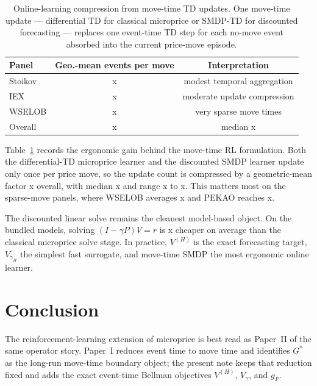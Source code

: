 \documentclass[11pt,twoside]{article}
\theoremstyle{plain}
\theoremstyle{definition}
\theoremstyle{remark}
\newcommand{\1}{\mathbf{1}}
\begin{document}
\begin{table}[t]
\centering
\small
\begin{tabular}{lcc}
\toprule
Panel & Geo.-mean events per move & Interpretation \\
\midrule
Stoikov & \RLEmpiricalMoveCompressionStoikovGeo{}x & modest temporal aggregation \\
IEX & \RLEmpiricalMoveCompressionIEXGeo{}x & moderate update compression \\
WSELOB & \RLEmpiricalMoveCompressionWSEGeo{}x & very sparse move times \\
Overall & \RLEmpiricalMoveCompressionGeo{}x & median \RLEmpiricalMoveCompressionMedian{}x \\
\bottomrule
\end{tabular}
\caption{Online-learning compression from move-time TD updates. One move-time update --- differential TD for classical microprice or SMDP-TD for discounted forecasting --- replaces one event-time TD step for each no-move event absorbed into the current price-move episode.}
\label{tab:compression}
\end{table}

Table~\ref{tab:compression} records the ergonomic gain behind the move-time RL formulation. Both the differential-TD microprice learner and the discounted SMDP learner update only once per price move, so the update count is compressed by a geometric-mean factor \RLEmpiricalMoveCompressionGeo{}x overall, with median \RLEmpiricalMoveCompressionMedian{}x and range \RLEmpiricalMoveCompressionMin{}x to \RLEmpiricalMoveCompressionMax{}x. This matters most on the sparse-move panels, where WSELOB averages \RLEmpiricalMoveCompressionWSEGeo{}x and PEKAO reaches \RLEmpiricalMoveCompressionMax{}x.

The discounted linear solve remains the cleanest model-based object. On the bundled models, solving $(I-\gamma P)V=r$ is \RLEmpiricalDiscountSpeedMean{}x cheaper on average than the classical microprice solve stage. In practice, $V^{(H)}$ is the exact forecasting target, $V_{\gamma_H}$ the simplest fast surrogate, and move-time SMDP the most ergonomic online learner.

\section{Conclusion}

The reinforcement-learning extension of microprice is best read as Paper~II of the same operator story. Paper~I reduces event time to move time and identifies $G^*$ as the long-run move-time boundary object; the present note keeps that reduction fixed and adds the exact event-time Bellman objectives $V^{(H)}$, $V_\gamma$, and $g_P$.
\end{document}
